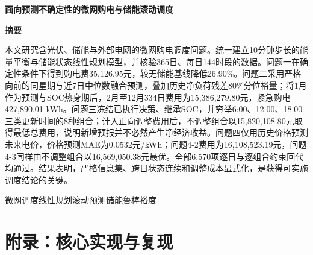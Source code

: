 \documentclass[fontset=fandol,12pt,a4paper]{ctexart}
\newcommand{\papertitle}[1]{\begin{center}{\zihao{2}\heiti\bfseries #1}\end{center}\vspace{0.8em}}
\newcommand{\abstractcn}[2]{\begin{center}{\zihao{3}\heiti\bfseries 摘要}\end{center}#1\par\vspace{0.8em}{\heiti\bfseries 关键词：}#2\newpage}
\begin{document}
\setcounter{page}{1}
\papertitle{面向预测不确定性的微网购电与储能滚动调度}
\abstractcn{本文研究含光伏、储能与外部电网的微网购电调度问题。统一建立10分钟步长的能量平衡与储能状态线性规划模型，并核验365日、每日144时段的数据。问题一在确定性条件下得到购电费35,126.95元，较无储能基线降低26.90\%。问题二采用严格向前的同星期与近7日中位数融合预测，叠加历史净负荷残差80\%分位裕量；将1月作为预测与SOC热身期后，2月至12月334日费用为15,386,279.80元，紧急购电427,890.01 kWh。问题三冻结已执行决策、继承SOC，并穷举6:00、12:00、18:00三类更新时间的8种组合；计入正向调整费用后，不调整组合以15,820,108.80元取得最低总费用，说明新增预报并不必然产生净经济收益。问题四仅用历史价格预测未来电价，价格预测MAE为0.0532元/kWh；问题4-2费用为16,108,523.19元，问题4-3同样由不调整组合以16,569,050.38元最优。全部6,570项逐日与逐组合约束回代均通过。结果表明，严格信息集、跨日状态连续和调整成本显式化，是获得可实施调度结论的关键。}{微网调度\quad 线性规划\quad 滚动预测\quad 储能\quad 鲁棒裕度}






\newpage\section*{附录：核心实现与复现}
\end{document}

